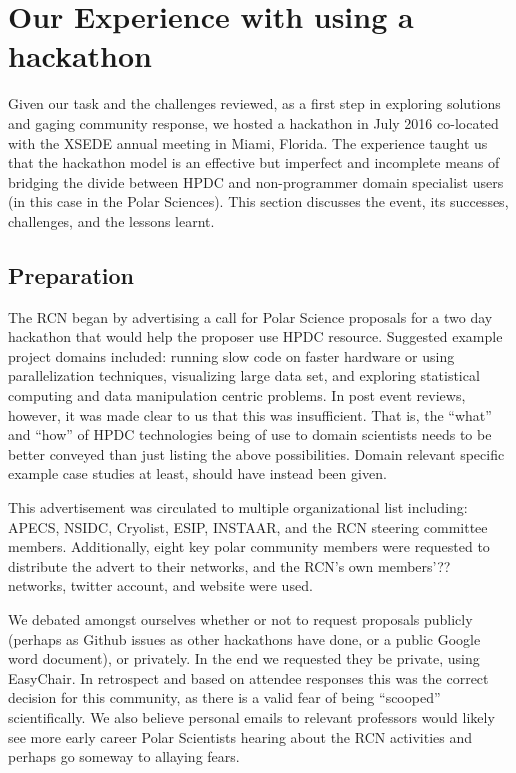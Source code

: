 \documentclass[conference]{IEEEtran}
\begin{document}
\section{Our Experience with using a hackathon}
Given our task and the challenges reviewed, as a first step in exploring solutions and gaging community response, we hosted a hackathon in July 2016 co-located with the XSEDE annual meeting in Miami, Florida. The experience taught us that the hackathon model is an effective but imperfect and incomplete means of bridging the divide between HPDC and non-programmer domain specialist users (in this case in the Polar Sciences). This section discusses the event, its successes, challenges, and the lessons learnt.

\subsection{Preparation}
The RCN began by advertising a call for Polar Science proposals for a two day hackathon that would help the proposer use HPDC resource.  Suggested example project domains included: running slow code on faster hardware or using parallelization techniques, visualizing large data set, and exploring statistical computing and data manipulation centric problems.  In post event reviews, however, it was made clear to us that this was insufficient. That is, the ``what'' and ``how'' of HPDC technologies being of use to domain scientists needs to be better conveyed than just listing the above possibilities.  Domain relevant specific example case studies at least, should have instead been given.

This advertisement was circulated to multiple organizational list including: APECS, NSIDC, Cryolist, ESIP, INSTAAR, and the RCN steering committee members.  Additionally, eight key polar community members were requested to distribute the advert to their networks, and the RCN's own members'?? networks, twitter account, and website were used.

We debated amongst ourselves whether or not to request proposals publicly (perhaps as Github issues as other hackathons have done, or a public Google word document), or privately.  In the end we requested they be private, using EasyChair.  In retrospect and based on attendee responses this was the correct decision for this community, as there is a valid fear of being ``scooped'' scientifically.  We also believe personal emails to relevant professors would likely see more early career Polar Scientists hearing about the RCN activities and perhaps go someway to allaying fears.
\end{document}
